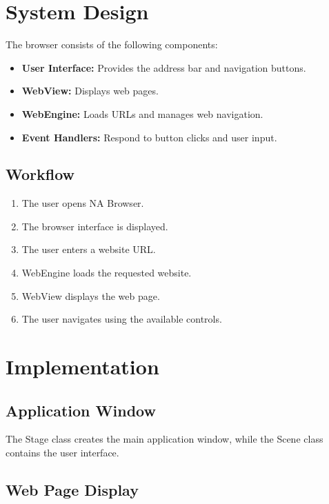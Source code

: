 \documentclass[12pt,a4paper]{report}
\begin{document}
\chapter{System Design}

The browser consists of the following components:

\begin{itemize}
    \item \textbf{User Interface:} Provides the
    address bar and navigation buttons.
    \item \textbf{WebView:} Displays web pages.
    \item \textbf{WebEngine:} Loads URLs and
    manages web navigation.
    \item \textbf{Event Handlers:} Respond to
    button clicks and user input.
\end{itemize}

\section{Workflow}

\begin{enumerate}
    \item The user opens NA Browser.
    \item The browser interface is displayed.
    \item The user enters a website URL.
    \item WebEngine loads the requested website.
    \item WebView displays the web page.
    \item The user navigates using the available controls.
\end{enumerate}

\chapter{Implementation}

\section{Application Window}

The Stage class creates the main application window,
while the Scene class contains the user interface.

\section{Web Page Display}
\end{document}
